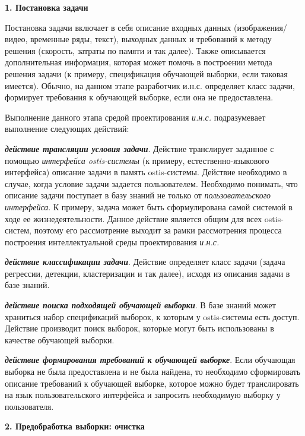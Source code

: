 \textbf{1. Постановка задачи}

Постановка задачи включает в себя описание входных данных (изображения/видео, временные ряды, текст), выходных данных и требований к методу решения (скорость, затраты по памяти и так далее). Также описывается дополнительная информация, которая может помочь в построении метода решения задачи (к примеру, спецификация обучающей выборки, если таковая имеется). Обычно, на данном этапе разработчик и.н.с. определяет класс задачи, формирует требования к обучающей выборке, если она не предоставлена.

Выполнение данного этапа средой проектирования \textit{и.н.с.} подразумевает выполнение следующих действий:
\begin{textitemize}
	\item \textbf{\textit{действие трансляции условия задачи}}. Действие транслирует заданное с помощью \textit{интерфейса ostis-системы} (к примеру, естественно-языкового интерфейса) описание задачи в память ostis-системы. Действие необходимо в случае, когда условие задачи задается пользователем. Необходимо понимать, что описание задачи поступает в базу знаний не только от \textit{пользовательского интерфейса}. К примеру, задача может быть сформулирована самой системой в ходе ее жизнедеятельности.
	Данное действие является общим для всех ostis-систем, поэтому его рассмотрение выходит за рамки рассмотрения процесса построения интеллектуальной среды проектирования \textit{и.н.с.}
	\item \textbf{\textit{действие классификации задачи}}. Действие определяет класс задачи (задача регрессии, детекции, кластеризации и так далее), исходя из описания задачи в базе знаний.
	\item \textbf{\textit{действие поиска подходящей обучающей выборки}}. В базе знаний может храниться набор спецификаций выборок, к которым у ostis-системы есть доступ. Действие производит поиск выборок, которые могут быть использованы в качестве обучающей выборки.
	\item \textbf{\textit{действие формирования требований к обучающей выборке}}. Если обучающая выборка не была предоставлена и не была найдена, то необходимо сформировать описание требований к обучающей выборке, которое можно будет транслировать на язык пользовательского интерфейса и запросить необходимую выборку у пользователя.
\end{textitemize}


\textbf{2. Предобработка выборки: очистка}

